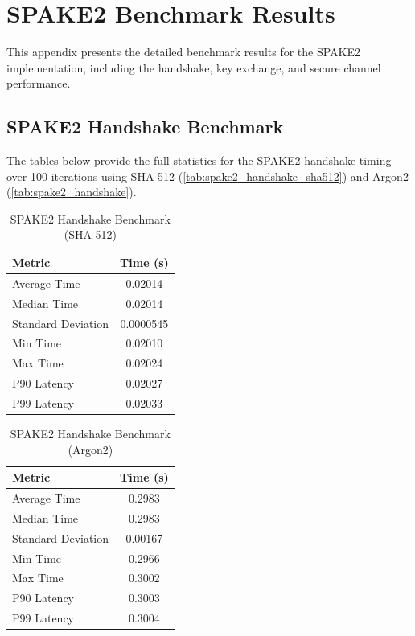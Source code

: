 \documentclass[twoside,a4paper,12pt]{article}
\begin{document}
\newpage
\renewcommand{\thesection}{\Alph{section}}
\section{SPAKE2 Benchmark Results}
\label{sec:appendix_benchmarks_spake2}
This appendix presents the detailed benchmark results for the SPAKE2 implementation, including the handshake, key exchange, and secure channel performance.

\subsection{SPAKE2 Handshake Benchmark}
The tables below provide the full statistics for the SPAKE2 handshake timing over 100 iterations using SHA-512 (\autoref{tab:spake2_handshake_sha512}) and Argon2 (\autoref{tab:spake2_handshake}).

\begin{table}[h]
    \centering
    \renewcommand{\arraystretch}{1.2}
    \begin{tabular}{l c}
        \toprule
        \textbf{Metric} & \textbf{Time (s)} \\
        \midrule
        Average Time & 0.02014 \\
        Median Time & 0.02014 \\
        Standard Deviation & 0.0000545 \\
        Min Time & 0.02010 \\
        Max Time & 0.02024 \\
        P90 Latency & 0.02027 \\
        P99 Latency & 0.02033 \\
        \bottomrule
    \end{tabular}
    \caption{SPAKE2 Handshake Benchmark (SHA-512)}
    \label{tab:spake2_handshake_sha512}
\end{table}

\begin{table}[h]
    \centering
    \renewcommand{\arraystretch}{1.2}
    \begin{tabular}{l c}
        \toprule
        \textbf{Metric} & \textbf{Time (s)} \\
        \midrule
        Average Time & 0.2983 \\
        Median Time & 0.2983 \\
        Standard Deviation & 0.00167 \\
        Min Time & 0.2966 \\
        Max Time & 0.3002 \\
        P90 Latency & 0.3003 \\
        P99 Latency & 0.3004 \\
        \bottomrule
    \end{tabular}
    \caption{SPAKE2 Handshake Benchmark (Argon2)}
    \label{tab:spake2_handshake}
\end{table}
\end{document}
